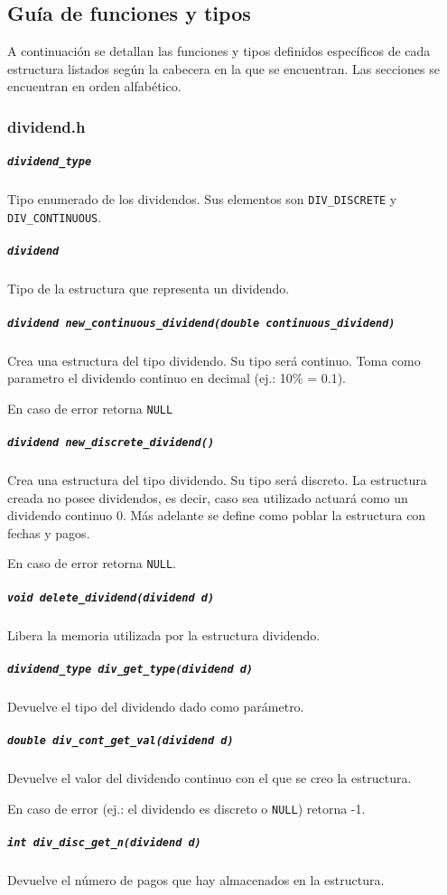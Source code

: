 \documentclass[12pt,a4paper,final]{article}
\begin{document}
	\subsection{Guía de funciones y tipos}
		A continuación se detallan las funciones y tipos definidos específicos de cada estructura
		listados según la cabecera en la que se encuentran. Las secciones se encuentran en orden alfabético.

		\subsubsection{dividend.h}

			\subparagraph{\texttt{dividend\_type}}
				Tipo enumerado de los dividendos. Sus elementos son
				\texttt{DIV\_DISCRETE} y \texttt{DIV\_CONTINUOUS}.

			\subparagraph{\texttt{dividend}}
				Tipo de la estructura que representa un dividendo.

			\subparagraph{\texttt{dividend new\_continuous\_dividend(double continuous\_dividend)}}
				Crea una estructura del tipo dividendo. Su tipo será continuo.
				Toma como parametro el dividendo continuo en decimal (ej.: 10\% = 0.1).

				En caso de error retorna \texttt{NULL}

			\subparagraph{\texttt{dividend new\_discrete\_dividend()}}
				Crea una estructura del tipo dividendo. Su tipo será discreto.
				La estructura creada no posee dividendos, es decir, caso sea utilizado
				actuará como un dividendo continuo 0. Más adelante se define como poblar
				la estructura con fechas y pagos.

				En caso de error retorna \texttt{NULL}.

			\subparagraph{\texttt{void delete\_dividend(dividend d)}}
				Libera la memoria utilizada por la estructura dividendo.

			\subparagraph{\texttt{dividend\_type div\_get\_type(dividend d)}}
				Devuelve el tipo del dividendo dado como parámetro.

			\subparagraph{\texttt{double div\_cont\_get\_val(dividend d)}}
				Devuelve el valor del dividendo continuo con el que se creo la estructura.

				En caso de error (ej.: el dividendo es discreto o \texttt{NULL}) retorna -1.

			\subparagraph{\texttt{int div\_disc\_get\_n(dividend d)}}

				Devuelve el número de pagos que hay almacenados en la estructura.
\end{document}
